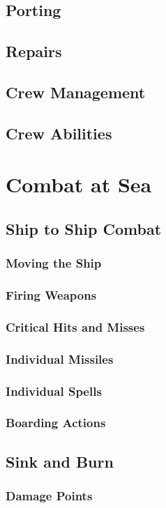 \begin{multicols*}{2}
\subsection{Porting}
\subsection{Repairs}
\subsection{Crew Management}
\subsection{Crew Abilities}
\section{Combat at Sea}
\subsection{Ship to Ship Combat}
\subsubsection{Moving the Ship}
\subsubsection{Firing Weapons}
\subsubsection{Critical Hits and Misses}
\subsubsection{Individual Missiles}
\subsubsection{Individual Spells}
\subsubsection{Boarding Actions}
\subsection{Sink and Burn}
\subsubsection{Damage Points}

\end{multicols*}
